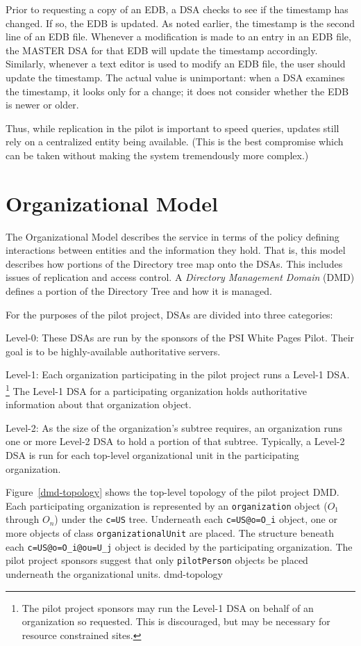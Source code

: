Prior to requesting a copy of an EDB,
a DSA checks to see if the timestamp has changed.
If so,
the EDB is updated.
As noted earlier,
the timestamp is the second line of an EDB file.
Whenever a modification is made to an entry in an EDB file,
the MASTER DSA for that EDB will update the timestamp accordingly.
Similarly,
whenever a text editor is used to modify an EDB file,
the user should update the timestamp.
The actual value is unimportant:
when a DSA examines the timestamp,
it looks only for a change;
it does not consider whether the EDB is newer or older.

Thus, while replication in the pilot is important to speed queries,
updates still rely on a centralized entity being available.
(This is the best compromise which can be taken without making the system
tremendously more complex.)

\section	{Organizational Model}
The Organizational Model describes the service in terms of the policy
defining interactions between entities and the information they hold.
That is,
this model describes how portions of the Directory tree map onto the DSAs.
This includes issues of replication and access control.
A {\em Directory Management Domain\/} (DMD) defines a portion of the
Directory Tree and how it is managed.

For the purposes of the pilot project,
DSAs are divided into three categories:
\begin{describe}
\item[Level-0:]	These DSAs are run by the sponsors of the PSI White
		Pages Pilot.  Their goal is to be highly-available
		authoritative servers.

\item[Level-1:]	Each organization participating in the pilot project runs
		a Level-1 DSA.%
\footnote{The pilot project sponsors may run the Level-1 DSA on behalf of an
organization so requested.
This is discouraged, but may be necessary for resource constrained sites.}
The Level-1 DSA for a participating organization holds authoritative
information about that organization object.

\item[Level-2:]	As the size of the organization's subtree requires,
an organization runs one or more Level-2 DSA to hold a portion of that subtree.
Typically,
a Level-2 DSA is run for each top-level organizational unit in the
participating organization.
\end{describe}
Figure~\ref{dmd-topology} shows the top-level topology of the pilot project DMD.
Each participating organization is represented by an \verb"organization"
object ($O_1$ through $O_n$) under the \verb"c=US" tree.
Underneath each \verb"c=US@o=O_i" object,
one or more objects of class \verb"organizationalUnit" are placed.
The structure beneath each \verb"c=US@o=O_i@ou=U_j" object
is decided by the participating organization.
The pilot project sponsors suggest that only \verb"pilotPerson" objects
be placed underneath the organizational units.
%
	{dmd-topology}

